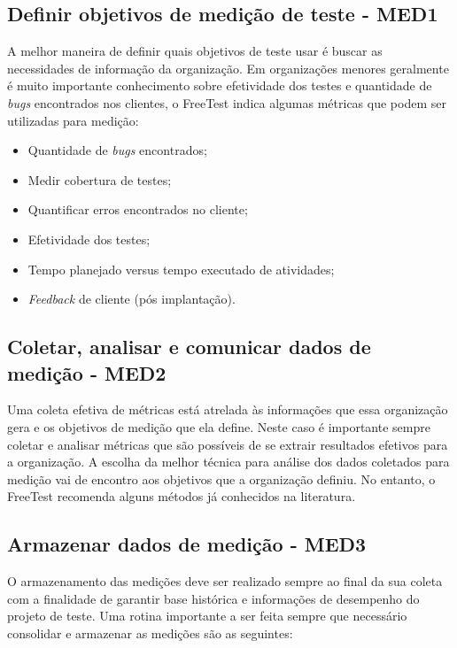 \subsection{Definir objetivos de medição de teste - MED1}
\label{sec:guiamed1}

A melhor maneira de definir quais objetivos de teste usar é buscar as necessidades de informação da organização. Em organizações menores geralmente é muito importante conhecimento sobre efetividade dos testes e quantidade de \textit{bugs} encontrados nos clientes, o FreeTest indica algumas métricas que podem ser utilizadas para medição:

\begin{itemize}
    \item Quantidade de \textit{bugs} encontrados;
    \item Medir cobertura de testes;
    \item Quantificar erros encontrados no cliente;
    \item Efetividade dos testes;
    \item Tempo planejado versus tempo executado de atividades;
    \item \textit{Feedback} de cliente (pós implantação).
\end{itemize}

\subsection{Coletar, analisar e comunicar dados de medição - MED2}
\label{sec:guiamed2}

Uma coleta efetiva de métricas está atrelada às informações que essa organização gera e os objetivos de medição que ela define. Neste caso é importante sempre coletar e analisar métricas que são possíveis de se extrair resultados efetivos para a organização. A escolha da melhor técnica para análise dos dados coletados para medição vai de encontro aos objetivos que a organização definiu. No entanto, o FreeTest recomenda alguns métodos já conhecidos na literatura.

\subsection{Armazenar dados de medição - MED3}
\label{sec:guiamed3}

O armazenamento das medições deve ser realizado sempre ao final da sua coleta com a finalidade de garantir base histórica e informações de desempenho do projeto de teste. Uma rotina importante a ser feita sempre que necessário consolidar e armazenar as medições são as seguintes:

